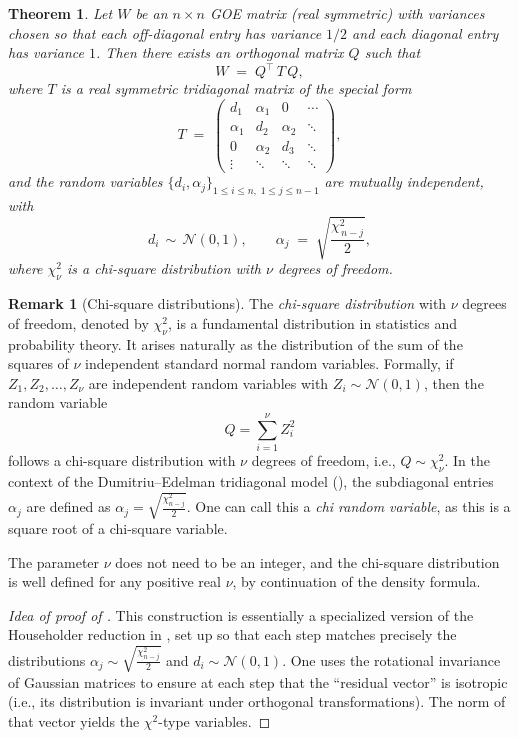 \documentclass[letterpaper,11pt,oneside,reqno]{article}
\numberwithin{equation}{section}
\newtheorem{theorem}[proposition]{Theorem}
\theoremstyle{definition}
\newtheorem{remark}[proposition]{Remark}
\begin{document}
\begin{theorem}
\label{thm:DE-model}
Let \(W\) be an \(n\times n\) GOE matrix (real symmetric) with variances chosen so that each off-diagonal entry has variance \(1/2\) and each diagonal entry has variance \(1\).  Then there exists an orthogonal matrix \(Q\) such that
\[
   W \;=\; Q^\top\,T\,Q,
\]
where \(T\) is a real symmetric tridiagonal matrix of the special form
\[
   T \;=\; \begin{pmatrix}
         d_1 & \alpha_1 & 0 & \cdots \\
         \alpha_1 & d_2 & \alpha_2 & \ddots \\
         0 & \alpha_2 & d_3 & \ddots \\
         \vdots & \ddots & \ddots & \ddots
       \end{pmatrix},
\]
and the random variables \(\{d_i,\alpha_j\}_{1 \le i \le n,\;1\le j\le n-1}\) are mutually independent, with
\[
  d_i \,\sim\, \mathcal{N}(0,1),
  \qquad
  \alpha_j \;=\; \sqrt{\frac{\chi^2_{\,n-j}}{2}},
\]
where \(\chi^2_{\nu}\) is a chi-square distribution with \(\nu\) degrees of freedom.
\end{theorem}

\begin{remark}[Chi-square distributions]
The \emph{chi-square distribution} with \(\nu\) degrees of
freedom, denoted by \(\chi^2_{\nu}\), is a fundamental
distribution in statistics and probability theory. It arises
naturally as the distribution of the sum of the squares of
\(\nu\) independent standard normal random variables.
Formally, if \(Z_1, Z_2, \ldots, Z_{\nu}\) are independent
random variables with \(Z_i \sim \mathcal{N}(0,1)\), then
the random variable
\[
  Q = \sum_{i=1}^{\nu} Z_i^2
\]
follows a chi-square distribution with \(\nu\) degrees of
freedom, i.e., \(Q \sim \chi^2_{\nu}\). In the context of
the Dumitriu–Edelman tridiagonal model
(), the subdiagonal entries \(\alpha_j\)
are defined as \(\alpha_j = \sqrt{\frac{\chi^2_{n-j}}{2}}\).
One can call this a \emph{chi random variable},
as this is a square root of a chi-square variable.

The parameter $\nu$ does not need to be an integer, and the
chi-square distribution is well defined for any positive
real $\nu$, by continuation of the density formula.
\end{remark}

\begin{proof}[Idea of proof of ]
	This construction is essentially a specialized version of
	the Householder reduction in , set up
	so that each step matches precisely the distributions
	\(\alpha_j\sim \sqrt{\tfrac{\chi^2_{n-j}}{2}}\) and
	\(d_i\sim\mathcal{N}(0,1)\).  One uses the rotational
	invariance of Gaussian matrices to ensure at each step that
	the ``residual vector'' is isotropic (i.e., its distribution
	is invariant under orthogonal transformations).  The norm
	of that vector yields the \(\chi^2\)-type variables.
\end{proof}
\end{document}

